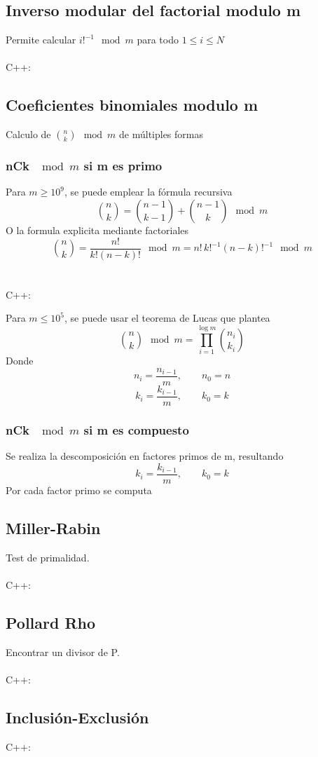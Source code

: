 \documentclass{article}
\begin{document}
    \subsection{Inverso modular del factorial modulo m}
        Permite calcular $ i!^{-1} \mod{m}$ para todo $1 \leq i \leq N$
        \\ \\
        C++:
        
    \subsection{Coeficientes binomiales modulo m}
        Calculo de $\binom{n}{k} \mod{m}$ de múltiples formas
        \subsubsection{nCk $\mod{m}$ si m es primo}
            Para $m \geq 10^9$, se puede emplear la fórmula recursiva
            \[
                \binom{n}{k} = \binom{n - 1}{k - 1} + \binom{n - 1}{k} \mod{m}
            \]
            O la formula explicita mediante factoriales
            \[
                \binom{n}{k} = \frac{n!}{k!(n-k)!}  \mod m = n!\, k!^{-1}(n - k)!^{-1} \mod{m}
            \]
            \\ \\
            C++:
            
            
            Para $ m \leq 10^5$, se puede usar el teorema de Lucas que plantea
            \[
                \binom{n}{k} \mod{m} = \prod_{i = 1}^{\log{m}}\binom{n_i}{k_i}
            \]
            Donde
            \[
                n_i = \frac{n_{i - 1}}{m}, \qquad n_0 = n
            \]
            \[
                k_i = \frac{k_{i - 1}}{m}, \qquad k_0 = k
            \]
        \subsubsection{nCk $\mod{m}$ si m es compuesto}
            Se realiza la descomposición en factores primos de m, resultando
            \[
                k_i = \frac{k_{i - 1}}{m}, \qquad k_0 = k
            \]
            Por cada factor primo se computa 
    \subsection{Miller-Rabin}
        Test de primalidad.
        \\ \\
        C++:
        
    \subsection{Pollard Rho}
        Encontrar un divisor de P.
        \\ \\
        C++:
        
    \subsection{Inclusión-Exclusión}
        C++:
        
    \
\pagebreak
\end{document}
